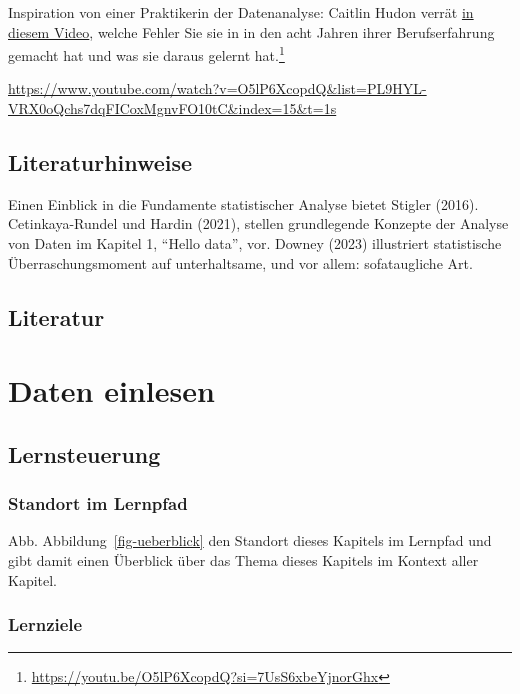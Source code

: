 \documentclass[
  a4paper,
  DIV=11]{scrreprt}
\theoremstyle{definition}
\theoremstyle{definition}
\theoremstyle{definition}
\theoremstyle{remark}
\begin{document}
Inspiration von einer Praktikerin der Datenanalyse: Caitlin Hudon verrät
\href{https://www.youtube.com/watch?v=O5lP6XcopdQ&list=PL9HYL-VRX0oQchs7dqFICoxMgnvFO10tC&index=15&t=1s}{in
diesem Video}, welche Fehler Sie sie in in den acht Jahren ihrer
Berufserfahrung gemacht hat und was sie daraus gelernt hat.\footnote{\url{https://youtu.be/O5lP6XcopdQ?si=7UsS6xbeYjnorGhx}}

\url{https://www.youtube.com/watch?v=O5lP6XcopdQ&list=PL9HYL-VRX0oQchs7dqFICoxMgnvFO10tC&index=15&t=1s}

\section{Literaturhinweise}\label{literaturhinweise}

Einen Einblick in die Fundamente statistischer Analyse bietet Stigler
(2016). Cetinkaya-Rundel und Hardin (2021), stellen grundlegende
Konzepte der Analyse von Daten im Kapitel 1, ``Hello data'', vor. Downey
(2023) illustriert statistische Überraschungsmoment auf unterhaltsame,
und vor allem: sofataugliche Art.

\section{Literatur}\label{literatur}

\chapter{Daten einlesen}\label{daten-einlesen}

\section{Lernsteuerung}\label{lernsteuerung-1}

\subsection{Standort im Lernpfad}\label{standort-im-lernpfad-1}

Abb. Abbildung~\ref{fig-ueberblick} den Standort dieses Kapitels im
Lernpfad und gibt damit einen Überblick über das Thema dieses Kapitels
im Kontext aller Kapitel.

\subsection{Lernziele}\label{lernziele-2}
\end{document}

